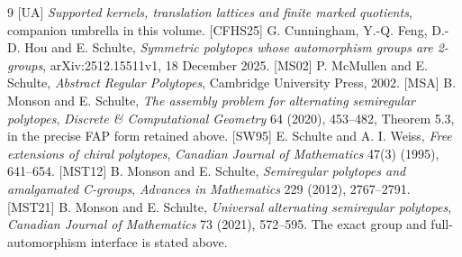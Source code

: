 \begin{thebibliography}{9}
[UA] \emph{Supported kernels, translation lattices and finite marked quotients},
companion umbrella in this volume.
[CFHS25] G. Cunningham, Y.-Q. Feng, D.-D. Hou and E. Schulte,
\emph{Symmetric polytopes whose automorphism groups are 2-groups},
arXiv:2512.15511v1, 18 December 2025.
[MS02] P. McMullen and E. Schulte,
\emph{Abstract Regular Polytopes}, Cambridge University Press, 2002.
[MSA] B. Monson and E. Schulte,
\emph{The assembly problem for alternating semiregular polytopes},
\emph{Discrete \& Computational Geometry} 64 (2020), 453--482,
Theorem 5.3, in the precise FAP form retained above.
[SW95] E. Schulte and A. I. Weiss,
\emph{Free extensions of chiral polytopes}, \emph{Canadian Journal of
Mathematics} 47(3) (1995), 641--654.
[MST12] B. Monson and E. Schulte,
\emph{Semiregular polytopes and amalgamated C-groups},
\emph{Advances in Mathematics} 229 (2012), 2767--2791.
[MST21] B. Monson and E. Schulte,
\emph{Universal alternating semiregular polytopes},
\emph{Canadian Journal of Mathematics} 73 (2021), 572--595.
The exact group and full-automorphism interface is stated above.
\end{thebibliography}

